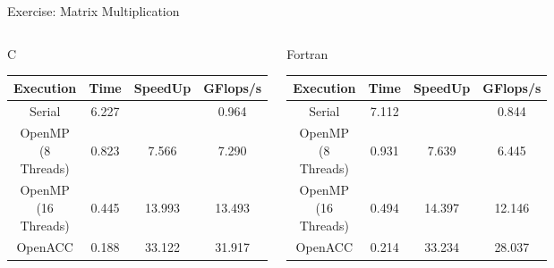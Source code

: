 \documentclass[c,mathserif,compress,xcolor=svgnames]{beamer}
\newenvironment{eblock}[0]
{
\begin{beamerboxesrounded}[upper=uppercol2,lower=lowercol2,shadow=true]}
{\end{beamerboxesrounded}}
\begin{document}
\begin{frame}{\small Exercise: Matrix Multiplication}
  \begin{columns}
    \begin{eblock}{C}
      \begin{tabular}{|c|c|c|c|}
        \hline
        Execution & Time & SpeedUp & GFlops/s \\
        \hline
        Serial & 6.227 &  & 0.964 \\
        OpenMP (8 Threads) & 0.823 & 7.566 & 7.290 \\
        OpenMP (16 Threads) & 0.445 & 13.993 & 13.493 \\
        OpenACC & 0.188 & 33.122 & 31.917 \\
        \hline
      \end{tabular}
    \end{eblock}
    \begin{eblock}{Fortran}
      \begin{tabular}{|c|c|c|c|}
        \hline
        Execution & Time & SpeedUp & GFlops/s \\
        \hline
        Serial & 7.112 & & 0.844 \\
        OpenMP (8 Threads) & 0.931 & 7.639 & 6.445 \\
        OpenMP (16 Threads) & 0.494 & 14.397 & 12.146 \\
        OpenACC & 0.214 & 33.234 & 28.037 \\
        \hline
      \end{tabular}
    \end{eblock}
  \end{columns}
%      
%      
\end{frame}
\end{document}
